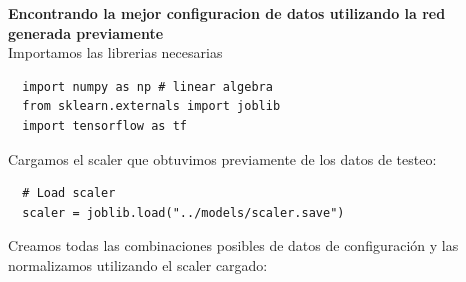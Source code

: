 \documentclass[osajnl,twocolumn,showpacs,superscriptaddress,10pt]{revtex4-1} %
\begin{document}
\clearpage

\textbf{Encontrando la mejor configuracion de datos utilizando la red generada previamente} \\

Importamos las librerias necesarias

\begin{verbatim}
  import numpy as np # linear algebra
  from sklearn.externals import joblib
  import tensorflow as tf
\end{verbatim}

Cargamos el scaler que obtuvimos previamente de los datos de testeo:

\begin{verbatim}
  # Load scaler
  scaler = joblib.load("../models/scaler.save")
\end{verbatim}

Creamos todas las combinaciones posibles de datos de configuración y las normalizamos utilizando el scaler cargado:
\end{document}
